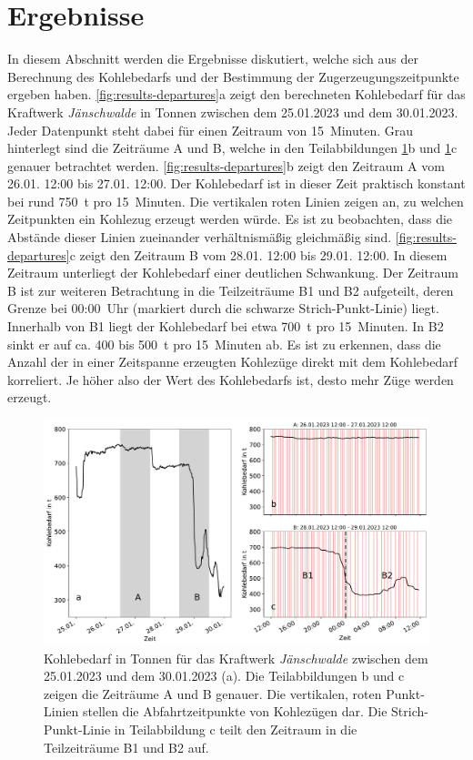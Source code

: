 \section{Ergebnisse}

In diesem Abschnitt werden die Ergebnisse diskutiert, welche sich aus der Berechnung des Kohlebedarfs und der Bestimmung der Zugerzeugungszeitpunkte ergeben haben. \autoref{fig:results-departures}a zeigt den berechneten Kohlebedarf für das Kraftwerk \emph{Jänschwalde} in Tonnen zwischen dem 25.01.2023 und dem 30.01.2023. Jeder Datenpunkt steht dabei für einen Zeitraum von 15~Minuten. Grau hinterlegt sind die Zeiträume A und B, welche in den Teilabbildungen \ref{fig:results-departures}b und \ref{fig:results-departures}c genauer betrachtet werden. \autoref{fig:results-departures}b zeigt den Zeitraum A vom 26.01. 12:00 bis 27.01. 12:00. Der Kohlebedarf ist in dieser Zeit praktisch konstant bei rund 750~t pro 15~Minuten. Die vertikalen roten Linien zeigen an, zu welchen Zeitpunkten ein Kohlezug erzeugt werden würde. Es ist zu beobachten, dass die Abstände dieser Linien zueinander verhältnismäßig gleichmäßig sind. \autoref{fig:results-departures}c zeigt den Zeitraum B vom 28.01. 12:00 bis 29.01. 12:00. In diesem Zeitraum unterliegt der Kohlebedarf einer deutlichen Schwankung. Der Zeitraum B ist zur weiteren Betrachtung in die Teilzeiträume B1 und B2 aufgeteilt, deren Grenze bei 00:00~Uhr (markiert durch die schwarze Strich-Punkt-Linie) liegt. Innerhalb von B1 liegt der Kohlebedarf bei etwa 700~t pro 15~Minuten. In B2 sinkt er auf ca. 400 bis 500~t pro 15~Minuten ab. Es ist zu erkennen, dass die Anzahl der in einer Zeitspanne erzeugten Kohlezüge direkt mit dem Kohlebedarf korreliert. Je höher also der Wert des Kohlebedarfs ist, desto mehr Züge werden erzeugt.

\begin{figure}[!ht]
	\centering
	\includegraphics[width=1.0\linewidth]{images/results/departures.pdf}
	\caption{Kohlebedarf in Tonnen für das Kraftwerk \emph{Jänschwalde} zwischen dem 25.01.2023 und dem 30.01.2023 (a). Die Teilabbildungen b und c zeigen die Zeiträume A und B genauer. Die vertikalen, roten Punkt-Linien stellen die Abfahrtzeitpunkte von Kohlezügen dar. Die Strich-Punkt-Linie in Teilabbildung c teilt den Zeitraum in die Teilzeiträume B1 und B2 auf.}
	\label{fig:results-departures}
\end{figure}


